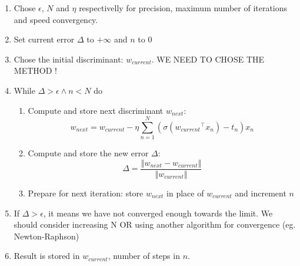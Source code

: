 \documentclass[a4paper, 10pt]{article}
\begin{document}
\begin{enumerate}
    \item Chose $\epsilon$, $N$ and $\eta$ respectivelly for precision, maximum number of iterations and speed convergency.
    \item Set current error $\Delta$ to $+\infty$ and $n$ to $0$
    \item Chose the initial discriminant: $w_{current}$. WE NEED TO CHOSE THE METHOD ! 
    \item While $\Delta > \epsilon \wedge n < N$ do
    \begin{enumerate}
        \item Compute and store next discriminant $w_{next}$:
$$
w_{next} = w_{current} - \eta \sum_{n=1}^{N}\left(\sigma({w_{current}}^\top x_n)-t_n\right)x_n
$$
        \item Compute and store the new error $\Delta$:
$$
\Delta = \frac{\left\Vert w_{next} - w_{current}\right\Vert}{\left\Vert w_{current} \right\Vert}
$$
        \item Prepare for next iteration: store $w_{next}$ in place of $w_{current}$ and increment $n$
    \end{enumerate}
    \item If $\Delta > \epsilon$, it means we have not converged enough towards the limit. We should consider increasing N OR using another algorithm for convergence (eg. Newton-Raphson)
    \item Result is stored in $w_{current}$, number of steps in $n$. 
\end{enumerate}
\end{document}
